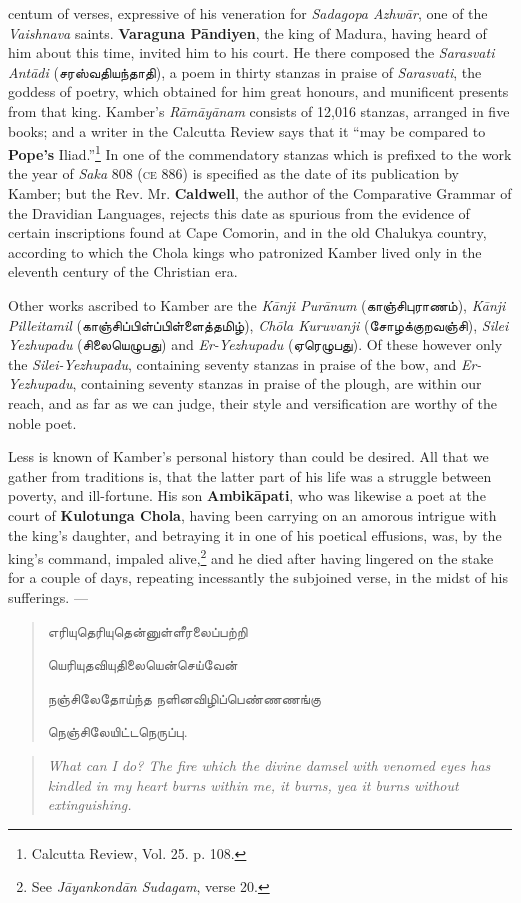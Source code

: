 \documentclass{article}
\newcommand{\TamilText}[1]{\texttamil{#1}}
\newcommand{\tam}[1]{\TamilText{#1}}
\begin{document}
centum of verses, expressive of his veneration for \emph{Sadagopa Azhw\={a}r}, one of the \emph{Vaishnava} saints. \textbf{Varaguna P\={a}ndiyen}, the king of Madura, having heard of him about this time, invited him to his court. He there composed the \emph{Sarasvati Ant\={a}di} (\tam{சரஸ்வதியந்தாதி}), a poem in thirty stanzas in praise of \emph{Sarasvati}, the goddess of poetry, which obtained for him great honours, and munificent presents from that king. Kamber's \emph{R\={a}m\={a}y\={a}nam} consists of 12,016 stanzas, arranged in five books; and a writer in the Calcutta Review says that it ``may be compared to \textbf{Pope's} Iliad.''\footnote{Calcutta Review, Vol. 25. p. 108.} In one of the commendatory stanzas which is prefixed to the work the year of \emph{Saka} 808 (\textsc{ce} 886) is specified as the date of its publication by Kamber; but the Rev. Mr. \textbf{Caldwell}, the author of the Comparative Grammar of the Dravidian Languages, rejects this date as spurious from the evidence of certain inscriptions found at Cape Comorin, and in the old Chalukya country, according to which the Chola kings who patronized Kamber lived only in the eleventh century of the Christian era.

Other works ascribed to Kamber are the \emph{K\={a}nji Pur\={a}num} (\tam{காஞ்சிபுராணம்}), \emph{K\={a}nji Pilleitamil} (\tam{காஞ்சிப்பிள்ப்பிள்ளைத்தமிழ்}), \emph{Ch\={o}la Kuruvanji} (\tam{சோழக்குறவஞ்சி}), \emph{Silei Yezhupadu} (\tam{சிலையெழுபது}) and \emph{Er-Yezhupadu} (\tam{ஏரெழுபது}). Of these however only the \emph{Silei-Yezhupadu}, containing seventy stanzas in praise of the bow, and \emph{Er-Yezhupadu}, containing seventy stanzas in praise of the plough, are within our reach, and as far as we can judge, their style and versification are worthy of the noble poet.

Less is known of Kamber's personal history than could be desired. All that we gather from traditions is, that the latter part of his life was a struggle between poverty, and ill-fortune. His son \textbf{Ambik\={a}pati}, who was likewise a poet at the court of \textbf{Kulotunga Chola}, having been carrying on an amorous intrigue with the king's daughter, and betraying it in one of his poetical effusions, was, by the king's command, impaled alive,\footnote{See \emph{J\={a}yankond\={a}n Sudagam}, verse 20.} and he died after having lingered on the stake for a couple of days, repeating incessantly the subjoined verse, in the midst of his sufferings. ---
\begin{quotation}\small
\tam{எரியுதெரியுதென்னுள்ளீரலைப்பற்றி}

\tam{யெரியுதவியுதிலையென்செய்வேன்‌}

\tam{நஞ்சிலேதோய்ந்த நளினவிழிப்பெண்ணணங்கு}

\tam{நெஞ்சிலேயிட்டநெருப்பு}.
\end{quotation}
\begin{quotation}\small
\emph{What can I do? The fire which the divine damsel with venomed eyes has kindled in my heart burns within me, it burns, yea it burns without extinguishing.}
\end{quotation}
\end{document}
